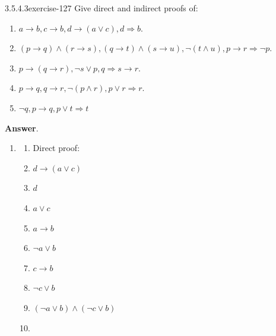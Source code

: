 \documentclass[twoside,10pt,]{book}
\numberwithin{equation}{section}
\begin{document}
\begin{divisionsolution}{3.5.4.3}{}{exercise-127}%
\hypertarget{p-1105}{}%
Give direct and indirect proofs of:%
\par
\hypertarget{p-1106}{}%
\leavevmode%
\begin{enumerate}[label=(\alph*)]
\item\hypertarget{li-595}{}\hypertarget{p-1107}{}%
\(a \rightarrow  b, c \rightarrow  b, d\rightarrow  (a \lor  c), d\Rightarrow  b\).%
\item\hypertarget{li-596}{}\hypertarget{p-1108}{}%
\((p\to q) \land (r\to s), (q\rightarrow t) \land  (s \to  u), \neg (t \land u), p \rightarrow  r \Rightarrow  \neg p\).%
\item\hypertarget{li-597}{}\hypertarget{p-1109}{}%
\(p\to (q\to r),\neg s \lor p,q\Rightarrow s\to r\).%
\item\hypertarget{li-598}{}\hypertarget{p-1110}{}%
\(p\rightarrow  q, q\rightarrow  r, \neg (p \land  r), p \lor  r \Rightarrow  r\).%
\item\hypertarget{li-599}{}\hypertarget{p-1111}{}%
\(\neg q, p\to q, p\lor t \Rightarrow t\)%
\end{enumerate}
%
\par\smallskip%
\noindent\textbf{Answer}.\quad%
\hypertarget{p-1112}{}%
\leavevmode%
\begin{enumerate}[label=(\alph*)]
\item\hypertarget{li-600}{}\hypertarget{p-1113}{}%
%
\begin{enumerate}[label=(\arabic*)]
\item\hypertarget{li-601}{}\hypertarget{p-1114}{}%
Direct proof:%
\item\hypertarget{li-602}{}\hypertarget{p-1115}{}%
\(d\to (a\lor c)\)%
\item\hypertarget{li-603}{}\hypertarget{p-1116}{}%
\(d\)%
\item\hypertarget{li-604}{}\hypertarget{p-1117}{}%
\(a\lor c\)%
\item\hypertarget{li-605}{}\hypertarget{p-1118}{}%
\(a\to b\)%
\item\hypertarget{li-606}{}\hypertarget{p-1119}{}%
\(\neg a \lor b\)%
\item\hypertarget{li-607}{}\hypertarget{p-1120}{}%
\(c\to b\)%
\item\hypertarget{li-608}{}\hypertarget{p-1121}{}%
\(\neg c\lor b\)%
\item\hypertarget{li-609}{}\hypertarget{p-1122}{}%
\((\neg a\lor b)\land (\neg c\lor b)\)%
\item\hypertarget{li-610}{}\hypertarget{p-1123}{}%

\end{enumerate}
\end{enumerate}
\end{divisionsolution}
\end{document}
